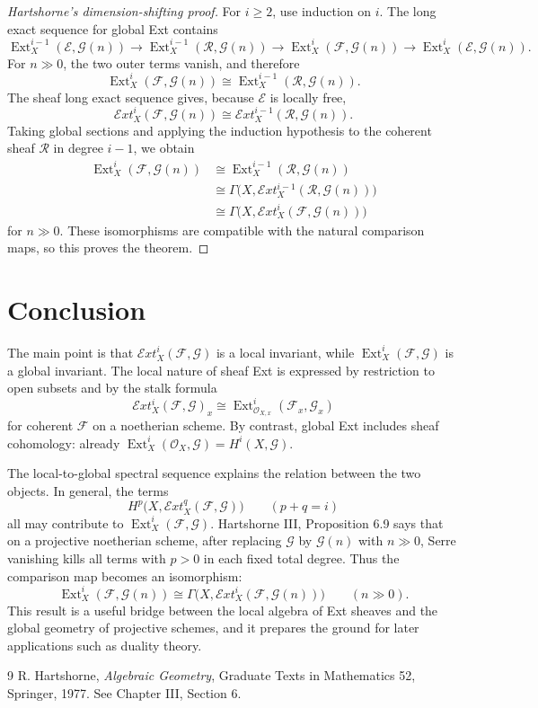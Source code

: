 \documentclass[11pt,a4paper]{article}
\numberwithin{equation}{section}
\theoremstyle{plain}
\theoremstyle{definition}
\theoremstyle{remark}
\newcommand{\OO}{\mathcal O}
\newcommand{\F}{\mathcal F}
\newcommand{\G}{\mathcal G}
\newcommand{\E}{\mathcal E}
\newcommand{\R}{\mathcal R}
\DeclareMathOperator{\Ext}{Ext}
\newcommand{\sExt}{\mathcal{E}\!xt}
\begin{document}
\begin{proof}[Hartshorne's dimension-shifting proof]
For \(i\ge2\), use induction on \(i\).  The long exact sequence for global Ext contains
\[
  \Ext_X^{i-1}(\E,\G(n))
  \longrightarrow
  \Ext_X^{i-1}(\R,\G(n))
  \longrightarrow
  \Ext_X^i(\F,\G(n))
  \longrightarrow
  \Ext_X^i(\E,\G(n)).
\]
For \(n\gg0\), the two outer terms vanish, and therefore
\[
  \Ext_X^i(\F,\G(n))
  \cong
  \Ext_X^{i-1}(\R,\G(n)).
\]
The sheaf long exact sequence gives, because \(\E\) is locally free,
\[
  \sExt_X^i(\F,\G(n))
  \cong
  \sExt_X^{i-1}(\R,\G(n)).
\]
Taking global sections and applying the induction hypothesis to the coherent sheaf \(\R\) in degree \(i-1\), we obtain
\[
\begin{aligned}
\Ext_X^i(\F,\G(n))
&\cong
\Ext_X^{i-1}(\R,\G(n)) \\
&\cong
\Gamma\bigl(X,\sExt_X^{i-1}(\R,\G(n))\bigr) \\
&\cong
\Gamma\bigl(X,\sExt_X^i(\F,\G(n))\bigr)
\end{aligned}
\]
for \(n\gg0\).  These isomorphisms are compatible with the natural comparison maps, so this proves the theorem.
\end{proof}

\section{Conclusion}

The main point is that \(\sExt_X^i(\F,\G)\) is a local invariant, while \(\Ext_X^i(\F,\G)\) is a global invariant.  The local nature of sheaf Ext is expressed by restriction to open subsets and by the stalk formula
\[
  \sExt_X^i(\F,\G)_x
  \cong
  \Ext_{\OO_{X,x}}^i(\F_x,\G_x)
\]
for coherent \(\F\) on a noetherian scheme.  By contrast, global Ext includes sheaf cohomology: already \(\Ext_X^i(\OO_X,\G)=H^i(X,\G)\).

The local-to-global spectral sequence explains the relation between the two objects.  In general, the terms
\[
  H^p\bigl(X,\sExt_X^q(\F,\G)\bigr)
  \qquad(p+q=i)
\]
all may contribute to \(\Ext_X^i(\F,\G)\).  Hartshorne III, Proposition 6.9 says that on a projective noetherian scheme, after replacing \(\G\) by \(\G(n)\) with \(n\gg0\), Serre vanishing kills all terms with \(p>0\) in each fixed total degree.  Thus the comparison map becomes an isomorphism:
\[
  \Ext_X^i(\F,\G(n))
  \cong
  \Gamma\bigl(X,\sExt_X^i(\F,\G(n))\bigr)
  \qquad(n\gg0).
\]
This result is a useful bridge between the local algebra of Ext sheaves and the global geometry of projective schemes, and it prepares the ground for later applications such as duality theory.

\begin{thebibliography}{9}
R. Hartshorne, \emph{Algebraic Geometry}, Graduate Texts in Mathematics 52, Springer, 1977.  See Chapter III, Section 6.
\end{thebibliography}
\end{document}
